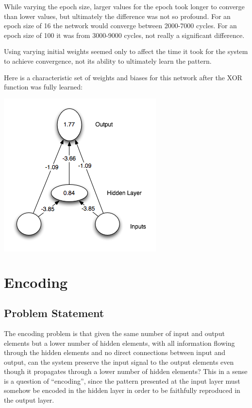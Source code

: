 \documentclass[12pt]{article}
\begin{document}
While varying the epoch size, larger values for the epoch took longer to converge than lower values, but ultimately the difference was not so profound.  For an epoch size of 16 the network would converge between 2000-7000 cycles.  For an epoch size of 100 it was from 3000-9000 cycles, not really a significant difference.  

Using varying initial weights seemed only to affect the time it took for the system to achieve convergence, not its ability to ultimately learn the pattern.  

Here is a characteristic set of weights and biases for this network after the XOR function was fully learned:

\includegraphics{xor.png}

\section{Encoding}

\subsection{Problem Statement}

The encoding problem is that given the same number of input and output elements but a lower number of hidden elements, with all information flowing through the hidden elements and no direct connections between input and output, can the system preserve the input signal to the output elements even though it propagates through a lower number of hidden elements?  This in a sense is a question of ``encoding'', since the pattern presented at the input layer must somehow be encoded in the hidden layer in order to be faithfully reproduced in the output layer.  
\end{document}
